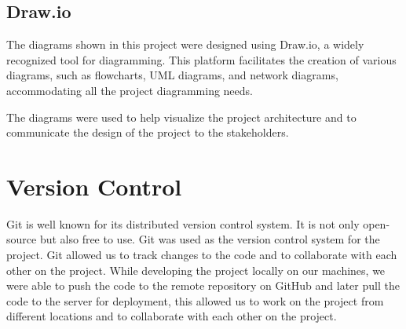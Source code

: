 \subsection{Draw.io}

The diagrams shown in this project were designed using Draw.io, a widely recognized tool for diagramming. This platform facilitates the creation of various 
diagrams, such as flowcharts, UML diagrams, and network diagrams, accommodating all the project diagramming needs.

The diagrams were used to help visualize the project architecture and to communicate the design of the
project to the stakeholders.

\section{Version Control}

Git is well known for its distributed version control system. It is not only open-source but also free to use.
Git was used as the version control system for the project. Git allowed us to track changes to the code and to collaborate with each other on the project.
While developing the project locally on our machines, we were able to push the code to the remote repository on GitHub and later pull the code to the server
for deployment, this allowed us to work on the project from different locations and to collaborate with each other on the project.

